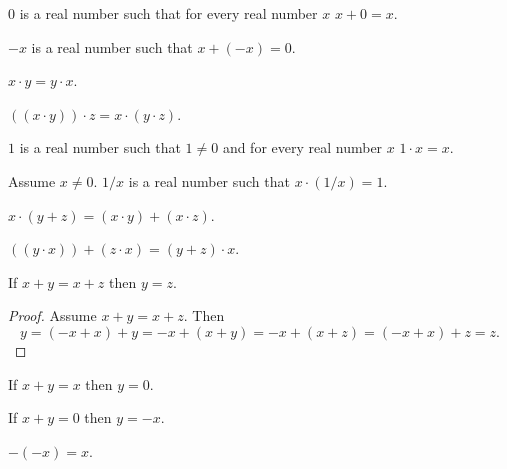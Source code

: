 \documentclass{article}
\begin{document}
\begin{forthel}
\begin{signature}[title=1 12 A4]
$0$ is a real number such that
for every real number $x$ $x + 0 = x$.
\end{signature}

\begin{signature}[title=1 12 A5]
$-x$ is a real number such that $x + (-x) = 0$.
\end{signature}

\begin{axiom}[title=1 12 M2]
$x \cdot y = y \cdot x$.
\end{axiom}

\begin{axiom}[title=1 12 M3]
$((x \cdot y)) \cdot z = x \cdot (y \cdot z)$.
\end{axiom}

\begin{signature}[title=1 12 M4]
$1$ is a real number such that $1 \neq 0$ and
for every real number $x$ $1 \cdot x = x$.
\end{signature}

\begin{signature}[title=1 12 M5]
Assume $x \neq 0$. $1/x$ is a real number
such that $x \cdot (1/x) = 1$.
\end{signature}

\begin{axiom}[title=1 12 D]
$x \cdot (y + z) = (x \cdot y) + (x \cdot z)$.
\end{axiom}

\begin{proposition}[title=Dist 1]
$((y \cdot x)) + (z \cdot x) = (y + z) \cdot x$.
\end{proposition}

\begin{proposition}[title=1 14 a]
If $x + y = x + z$ then $y = z$.
\end{proposition}
\begin{proof}
Assume $x + y = x + z$.
Then \[ y = (-x+x) + y = -x + (x+y) = -x + (x+z) = (-x+x) + z = z. \]
\end{proof}

\begin{proposition}[title=1 14 b]
If $x + y = x$ then $y = 0$.
\end{proposition}

\begin{proposition}[title=1 14 c]
If $x + y = 0$ then $y = -x$.
\end{proposition}

\begin{proposition}[title=1 14 d]
$-(-x) = x$.
\end{proposition}



\end{forthel}
\end{document}
